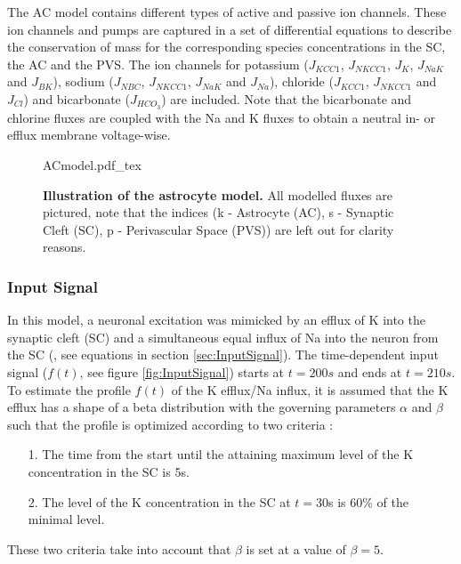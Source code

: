 The AC model contains different types of active and passive ion channels. These ion channels and pumps are captured in a set of differential equations to describe the conservation of mass for the corresponding species concentrations in the SC, the \gls{AC} and the \gls{PVS}. The ion channels for potassium ($ J_{KCC1}$, $ J_{NKCC1} $, $ J_{K}$, $ J_{NaK} $ and $J_{BK}$), sodium ($ J_{NBC} $, $ J_{NKCC1} $,  $ J_{NaK} $ and  $ J_{Na} $), chloride ($ J_{KCC1}$, $ J_{NKCC1} $ and $ J_{Cl} $) and bicarbonate ($ J_{HCO_3}$) are included. Note that the bicarbonate and chlorine fluxes are coupled with the \gls{Na} and \gls{K} fluxes to obtain a neutral in- or efflux membrane voltage-wise.\\

\begin{figure}[h!]
  \centering
  \def\svgwidth{450pt} %
  \scriptsize
  {ACmodel.pdf_tex}
  \caption{\textbf{Illustration of the astrocyte model.} All modelled fluxes are pictured, note that the indices (k - Astrocyte (AC), s - Synaptic Cleft (SC), p - Perivascular Space (PVS)) are left out for clarity reasons.}
\label{fig:ACmodel}
\end{figure}
\vspace{3cm}

\subsubsection{Input Signal}
In this model, a neuronal excitation was mimicked by an efflux of \gls{K} into the synaptic cleft (SC) and a simultaneous equal influx of \gls{Na} into the neuron from the SC (\citet{Ostby2009}, see equations in section \ref{sec:InputSignal}). The time-dependent input signal ($f(t)$, see figure \ref{fig:InputSignal}) starts at $t=200 s$ and ends at $t=210 s$. To estimate the profile $f(t)$ of the \gls{K} efflux/\gls{Na} influx, it is assumed that the \gls{K} efflux has a shape of a beta distribution with the governing parameters $\alpha$ and $\beta$ such that the profile is optimized according to two criteria \cite{Ostby2009}:\\
%
\begin{itemize}
\item [1.] The time from the start until the attaining maximum level of the \gls{K} concentration in the SC is 5s.
\item [2.] The level of the \gls{K} concentration in the SC at $ t = 30 $s is 60\% of the minimal level.
\end{itemize}
%
These two criteria take into account that $\beta$ is set at a value of $\beta = 5$.\\

